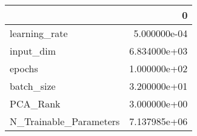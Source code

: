 \begin{tabular}{lr}
\toprule
{} &             0 \\
\midrule
learning\_rate          &  5.000000e-04 \\
input\_dim              &  6.834000e+03 \\
epochs                 &  1.000000e+02 \\
batch\_size             &  3.200000e+01 \\
PCA\_Rank               &  3.000000e+00 \\
N\_Trainable\_Parameters &  7.137985e+06 \\
\bottomrule
\end{tabular}
